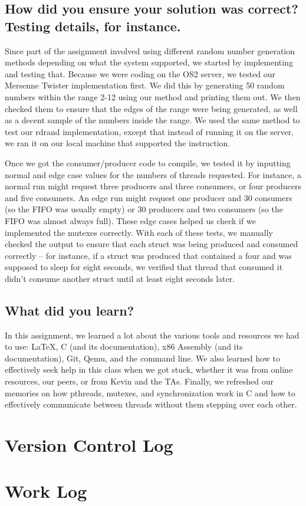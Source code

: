 \documentclass[letterpaper,10pt,titlepage]{article}
\begin{document}
\subsection{How did you ensure your solution was correct? Testing details, for instance.}
Since part of the assignment involved using different random number generation methods depending on what the system supported, we started by implementing and testing that.
Because we were coding on the OS2 server, we tested our Mersenne Twister implementation first.
We did this by generating 50 random numbers within the range 2-12 using our method and printing them out.
We then checked them to ensure that the edges of the range were being generated, as well as a decent sample of the numbers inside the range.
We used the same method to test our rdrand implementation, except that instead of running it on the server, we ran it on our local machine that supported the instruction.

Once we got the consumer/producer code to compile, we tested it by inputting normal and edge case values for the numbers of threads requested.
For instance, a normal run might request three producers and three consumers, or four producers and five consumers.
An edge run might request one producer and 30 consumers (so the FIFO was usually empty) or 30 producers and two consumers (so the FIFO was almost always full).
These edge cases helped us check if we implemented the mutexes correctly.
With each of these tests, we manually checked the output to ensure that each struct was being produced and consumed correctly – for instance, if a struct was produced that contained a four and was supposed to sleep for eight seconds, we verified that thread that consumed it didn’t consume another struct until at least eight seconds later.


\subsection{What did you learn?}
In this assignment, we learned a lot about the various tools and resources we had to use: LaTeX, C (and its documentation), x86 Assembly (and its documentation), Git, Qemu, and the command line.
We also learned how to effectively seek help in this class when we got stuck, whether it was from online resources, our peers, or from Kevin and the TAs.
Finally, we refreshed our memories on how pthreads, mutexes, and synchronization work in C and how to effectively communicate between threads without them stepping over each other.


\section{Version Control Log} 




\section{Work Log}
\end{document}
